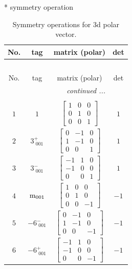 \documentclass[fleqn,8pt]{jsarticle}
\begin{document}
* symmetry operation
\renewcommand{\arraystretch}{1.3}
\begin{longtable}{cccc}
\caption{Symmetry operations for 3d polar vector.}
 \\
 \hline \hline
No. & tag & matrix (polar) & det \\ \hline \endfirsthead

\multicolumn{3}{l}{\tablename\ \thetable{}} \\
 \hline \hline
No. & tag & matrix (polar) & det \\ \hline \endhead

 \hline \hline
\multicolumn{3}{r}{\footnotesize\it continued ...} \\ \endfoot

 \hline \hline
\multicolumn{3}{r}{} \\ \endlastfoot

$ 1 $ & $ 1 $ & $ \begin{bmatrix} 1 & 0 & 0 \\ 0 & 1 & 0 \\ 0 & 0 & 1 \end{bmatrix} $ & $ 1 $ \\ \hline
$ 2 $ & $ 3^{+}_{\,\,001} $ & $ \begin{bmatrix} 0 & -1 & 0 \\ 1 & -1 & 0 \\ 0 & 0 & 1 \end{bmatrix} $ & $ 1 $ \\ \hline
$ 3 $ & $ 3^{-}_{\,\,001} $ & $ \begin{bmatrix} -1 & 1 & 0 \\ -1 & 0 & 0 \\ 0 & 0 & 1 \end{bmatrix} $ & $ 1 $ \\ \hline
$ 4 $ & $ {\rm m}_{001} $ & $ \begin{bmatrix} 1 & 0 & 0 \\ 0 & 1 & 0 \\ 0 & 0 & -1 \end{bmatrix} $ & $ -1 $ \\ \hline
$ 5 $ & $ -6^{-}_{\,\,001} $ & $ \begin{bmatrix} 0 & -1 & 0 \\ 1 & -1 & 0 \\ 0 & 0 & -1 \end{bmatrix} $ & $ -1 $ \\ \hline
$ 6 $ & $ -6^{+}_{\,\,001} $ & $ \begin{bmatrix} -1 & 1 & 0 \\ -1 & 0 & 0 \\ 0 & 0 & -1 \end{bmatrix} $ & $ -1 $ \\
\end{longtable}
\end{document}

